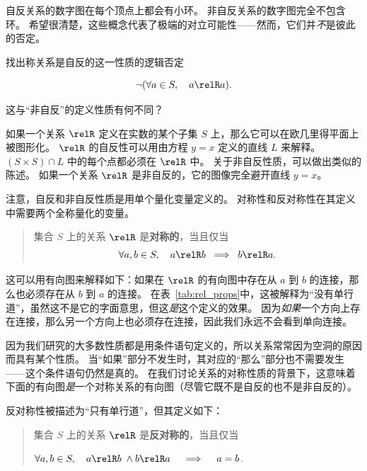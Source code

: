 \clearpage

自反关系的数字图在每个顶点上都会有小环。
非自反关系的数字图完全不包含环。
希望很清楚，这些概念代表了极端的对立可能性——然而，它们并\emph{不}是彼此的否定。

\begin{exer}
找出称关系是自反的这一性质的逻辑否定

\[ {\lnot}(\forall a \in S, \quad a \relR a).
\]

这与“非自反”的定义性质有何不同？
\end{exer}

如果一个关系 $\relR$ 定义在实数的某个子集 $S$ 上，那么它可以在欧几里得平面上被图形化。
$\relR$ 的自反性可以用由方程 $y=x$ 定义的直线 $L$ 来解释。
$(S \times S) \cap L$ 中的每个点都必须在 $\relR$ 中。
关于非自反性质，可以做出类似的陈述。
如果一个关系 $\relR$ 是非自反的，它的图像完全避开直线 $y=x$。

注意，自反和非自反性质是用单个量化变量定义的。
对称性和反对称性在其定义中需要两个全称量化的变量。

\begin{quote}
集合 $S$ 上的关系 $\relR$ 是{\bf 对称的}，当且仅当
\[ \forall a,b \in S, \quad a \relR b \;
\implies \; b \relR a. \] 
\end{quote}

\noindent 这可以用有向图来解释如下：如果在 $\relR$ 的有向图中存在从 $a$ 到 $b$ 的连接，那么也必须存在从 $b$ 到 $a$ 的连接。
在表~\ref{tab:rel_props}中，这被解释为“没有单行道”，虽然这不是它的字面意思，但这\emph{是}这个定义的效果。
因为\emph{如果}一个方向上存在连接，那么另一个方向上也必须存在连接，因此我们永远不会看到单向连接。

因为我们研究的大多数性质都是用条件语句定义的，所以关系常常因为空洞的原因而具有某个性质。
当“如果”部分不发生时，其对应的“那么”部分也不需要发生——这个条件语句仍然是真的。
在我们讨论关系的对称性质的背景下，这意味着下面的有向图\emph{是}一个对称关系的有向图（尽管它既不是自反的也不是非自反的）。

\begin{center}

\end{center}

反对称性被描述为“只有单行道”，但其定义如下：

\begin{quote}
集合 $S$ 上的关系 $\relR$ 是{\bf 反对称的}，当且仅当 \newline
\centerline{ $\displaystyle \forall a,b \in S, \quad a \relR b \;
\land b \relR a \quad \implies \quad a=b$.}
\end{quote}

